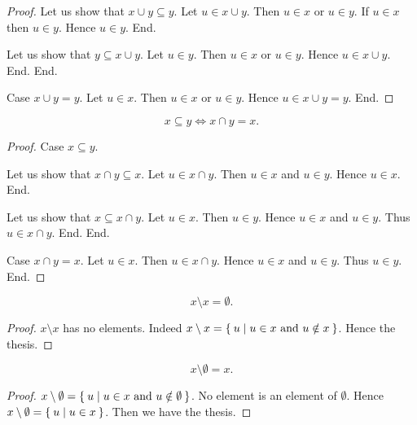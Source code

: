 \documentclass[../../sets-and-functions.ftl.tex]{subfiles}
\begin{document}
\begin{forthel}
\begin{proof}
        Let us show that $x \cup y \subseteq y$.
          Let $u \in x \cup y$.
          Then $u \in x$ or $u \in y$.
          If $u \in x$ then $u \in y$.
          Hence $u \in y$.
        End.

        Let us show that $y \subseteq x \cup y$.
          Let $u \in y$.
          Then $u \in x$ or $u \in y$.
          Hence $u \in x \cup y$.
        End.
      End.

      Case $x \cup y = y$.
        Let $u \in x$.
        Then $u \in x$ or $u \in y$.
        Hence $u \in x \cup y = y$.
      End.
    \end{proof}


    \begin{proposition}\label{SetTheory_01_01_681535}
      \[ x \subseteq y \iff x \cap y = x. \]
    \end{proposition}
    \begin{proof}
      Case $x \subseteq y$.

        Let us show that $x \cap y \subseteq x$.
          Let $u \in x \cap y$.
          Then $u \in x$ and $u \in y$.
          Hence $u \in x$.
        End.

        Let us show that $x \subseteq x \cap y$.
          Let $u \in x$.
          Then $u \in y$.
          Hence $u \in x$ and $u \in y$.
          Thus $u \in x \cap y$.
        End.
      End.

      Case $x \cap y = x$.
        Let $u \in x$.
        Then $u \in x \cap y$.
        Hence $u \in x$ and $u \in y$.
        Thus $u \in y$.
      End.
    \end{proof}

    \begin{proposition}\label{SetTheory_01_01_402739}
      \[ x \setminus x = \emptyset. \]
    \end{proposition}
    \begin{proof}
      $x \setminus x$ has no elements.
      Indeed $x \setminus x = \Set{u | \text{$u \in x$ and $u \notin x$}}$.
      Hence the thesis.
    \end{proof}


    \begin{proposition}\label{SetTheory_01_01_661163}
      \[ x \setminus \emptyset = x. \]
    \end{proposition}
    \begin{proof}
      $x \setminus \emptyset = \Set{u | \text{$u \in x$ and $u \notin \emptyset$}}$.
      No element is an element of $\emptyset$.
      Hence $x \setminus \emptyset = \Set{u | u \in x}$.
      Then we have the thesis.
    \end{proof}


\end{forthel}
\end{document}
